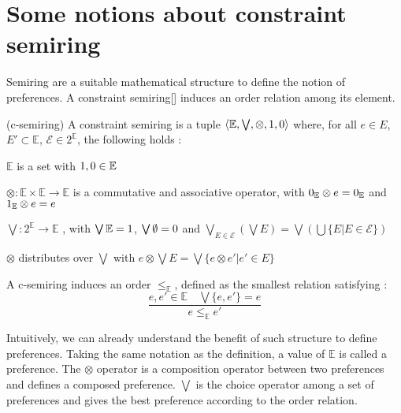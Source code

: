 \section{Some notions about constraint semiring}
Semiring are a suitable mathematical structure to define the notion of preferences. A constraint semiring[] induces an order relation among its element. 
\begin{definition} (c-semiring)
	A constraint semiring is a tuple $\left\langle \mathbb{E}, \bigvee, \otimes, \boldmath{1},\boldmath{0} \right\rangle$ where, for all $e\in E$, $E' \subset \mathbb{E}$, $\mathcal{E} \in 2^{\mathbb{E}}$, the following holds  :
		\begin{list}{-}{ }
			\item $\mathbb{E}$ is a set with $\boldmath{1},\boldmath{0} \in \mathbb{E}$
			\item $\otimes : \mathbb{E} \times \mathbb{E} \rightarrow \mathbb{E}$ is a commutative and associative operator, with $\boldmath{0}_{\mathbb{E}} \otimes e = \boldmath{0}_{\mathbb{E}}$ and $\boldmath{1}_{\mathbb{E}} \otimes e = e$
			\item $\bigvee : 2^{\mathbb{E}} \rightarrow \mathbb{E}$ , with $\bigvee{\mathbb{E}}=\boldmath{1} $, $\bigvee{\emptyset}=\boldmath{0}$ and $\bigvee_{E \in \mathcal{E}}{(\bigvee{E})}= \bigvee{(\bigcup \{E | E \in \mathcal{E}\})}$
			\item $\otimes$ distributes over $\bigvee$ with $e \otimes \bigvee E = \bigvee \{ e \otimes e' | e' \in E \}$
		\end{list} 
	A c-semiring induces an order $\leq_{\mathbb{E}}$, defined as the smallest relation satisfying :
		$$
					\frac{e,e' \in \mathbb{E} \quad \bigvee\{e,e'\}=e}{e \leq_{\mathbb{E}} e'}
		$$
\end{definition}

Intuitively, we can already understand the benefit of such structure to define preferences. Taking the same notation as the definition, a value of $\mathbb{E}$ is called a preference. The $\otimes$ operator is a composition operator between two preferences and defines a composed preference. $\bigvee$ is the choice operator among a set of preferences and gives the best preference according to the order relation.


